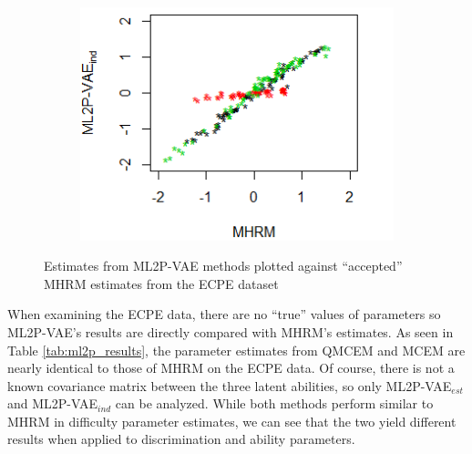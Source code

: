 \begin{figure}[h]
\begin{subfigure}{.32\textwidth}
    \end{subfigure}
    \begin{subfigure}{.32\textwidth}
      \centering
      \includegraphics[width=.9\linewidth]{img/ml_journal_results/ecpe/vae_ind_theta_ecpe.png}
    \end{subfigure}
    \caption{Estimates from ML2P-VAE methods plotted against ``accepted'' MHRM estimates from the ECPE dataset}
    \label{fig:ecpe_cor}
\end{figure}

When examining the ECPE data, there are no ``true'' values of parameters so ML2P-VAE's results are directly compared with MHRM's estimates. As seen in Table \ref{tab:ml2p_results}, the parameter estimates from QMCEM and MCEM are nearly identical to those of MHRM on the ECPE data. Of course, there is not a known covariance matrix between the three latent abilities, so only ML2P-VAE$_{est}$ and ML2P-VAE$_{ind}$ can be analyzed. While both methods perform similar to MHRM in difficulty parameter estimates, we can see that the two yield different results when applied to discrimination and ability parameters. 

